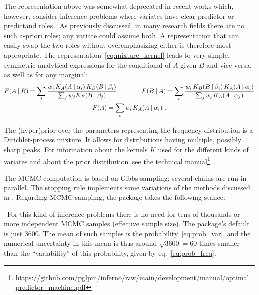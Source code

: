 The representation above was somewhat deprecated in recent works which, however, consider inference problems where variates have clear predictor or predictand roles \citep[e.g.][]{wadeetal2014,wadeetal2014b}. As previously discussed, in many research fields there are no such a-priori roles; any variate could assume both. A representation that can easily swap the two roles  without overemphasizing either is therefore most appropriate. The representation~\eqref{eq:mixture_kernel} leads to very simple, symmetric analytical expressions for the conditional of $A$ given $B$ and vice versa, as well as for any marginal:
\begin{equation*}
  \begin{gathered}
    \yF(A \| B) = \sum_{i}
    \frac{w_{i}\, K_{A}(A \| \alpha_{i})\, K_{B}(B \| \beta_{i})}{\sum_{j} w_{j}K_{B}(B \| \beta_{j})}
\qquad\qquad    \yF(B \| A) = \sum_{i}
    \frac{w_{i}\, K_{B}(B \| \beta_{i})\, K_{A}(A \| \alpha_{i})}{\sum_{j} w_{j}K_{A}(A \| \alpha_{j})}
    \\
    \yF(A) = \sum_{i}
    w_{i}\, K_{A}(A \| \alpha_{i}) \ .
  \end{gathered}
\end{equation*}

The (hyper)prior over the parameters representing the frequency distribution is a  Dirichlet-process mixture. It allows for distributions having multiple, possibly sharp peaks. For information about the kernels $K$ used for the different kinds of variates and about the prior distribution, see the technical manual\footnote{\url{https://github.com/pglpm/inferno/raw/main/development/manual/optimal_predictor_machine.pdf}}.

\medskip

The MCMC computation is based on Gibbs sampling; several chains are run in parallel. The stopping rule implements some variations of the methods discussed in \cite{vehtarietal2021}. Regarding MCMC sampling, the package takes the following stance:

\textbullet\ For this kind of inference problems there is no need for tens of thousands or more independent MCMC samples (effective sample size). The package's default is just 3600. The mean of such samples is the probability~\eqref{eq:prob_var}, and the numerical uncertainty in this mean is thus around $\sqrt{3600} = 60$ times smaller than the ``variability'' of this probability, given by eq.~\eqref{eq:prob_freq}.


